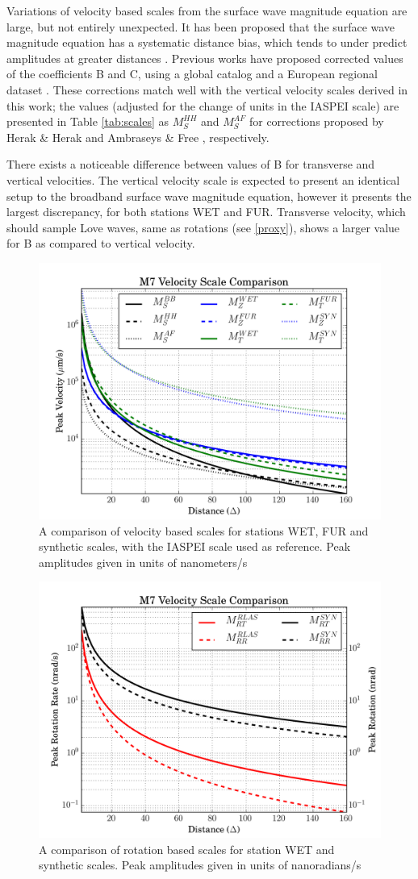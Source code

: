 \documentclass{gji}
\begin{document}
Variations of velocity based scales from the surface wave magnitude equation are large, but not entirely unexpected. It has been proposed that the surface wave magnitude equation has a systematic distance bias, which tends to under predict amplitudes at greater distances \cite{herak1993distance}. Previous works have proposed corrected values of the coefficients B and C, using a global catalog \cite{herak1993distance} and a European regional dataset \cite{ambraseys1997surface}. These corrections match well with the vertical velocity scales derived in this work; the values (adjusted for the change of units in the IASPEI scale) are presented in Table \ref{tab:scales} as $M_S^{HH}$ and $M_S^{AF}$ for corrections proposed by Herak \& Herak  and Ambraseys \& Free , respectively. 

There exists a noticeable difference between values of B for transverse and vertical velocities. The vertical velocity scale is expected to present an identical setup to the broadband surface wave magnitude equation, however it presents the largest discrepancy, for both stations WET and FUR.  Transverse velocity, which should sample Love waves, same as rotations (see \ref{proxy}), shows a larger value for B as compared to vertical velocity.

\begin{figure}
\centerline{\includegraphics[width=.5\textwidth]{velocityscales}}
\caption{A comparison of velocity based scales for stations WET, FUR and synthetic scales, with the IASPEI scale used as reference. Peak amplitudes given in units of nanometers/s}
\label{fig:vel_scale}
\end{figure}

\begin{figure}
\centerline{\includegraphics[width=.5\textwidth]{rrscales}}
\caption{A comparison of rotation based scales for station WET and synthetic scales. Peak amplitudes given in units of nanoradians/s}
\label{fig:rr_scale}
\end{figure}
\end{document}
